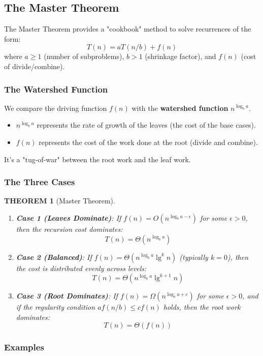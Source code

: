 \documentclass[12pt]{article}
\theoremstyle{blueplain}
\newtheorem{theorem}{THEOREM}[section]
\theoremstyle{bluedef}
\theoremstyle{blueremark}
\begin{document}
\subsection{The Master Theorem}

The Master Theorem provides a "cookbook" method to solve recurrences of the form:
\[ T(n) = aT(n/b) + f(n) \]
where $a \ge 1$ (number of subproblems), $b > 1$ (shrinkage factor), and $f(n)$ (cost of divide/combine).

\subsubsection{The Watershed Function}
We compare the driving function $f(n)$ with the \textbf{watershed function} $n^{\log_b a}$.
\begin{itemize}
    \item $n^{\log_b a}$ represents the rate of growth of the leaves (the cost of the base cases).
    \item $f(n)$ represents the cost of the work done at the root (divide and combine).
\end{itemize}
It's a "tug-of-war" between the root work and the leaf work.

\subsubsection{The Three Cases}

\begin{theorem}[Master Theorem]
    \begin{enumerate}
        \item \textbf{Case 1 (Leaves Dominate)}: If $f(n) = O(n^{\log_b a - \epsilon})$ for some $\epsilon > 0$, then the recursion cost dominates:
              \[ T(n) = \Theta(n^{\log_b a}) \]
        \item \textbf{Case 2 (Balanced)}: If $f(n) = \Theta(n^{\log_b a} \lg^k n)$ (typically $k=0$), then the cost is distributed evenly across levels:
              \[ T(n) = \Theta(n^{\log_b a} \lg^{k+1} n) \]
        \item \textbf{Case 3 (Root Dominates)}: If $f(n) = \Omega(n^{\log_b a + \epsilon})$ for some $\epsilon > 0$, and if the regularity condition $af(n/b) \le cf(n)$ holds, then the root work dominates:
              \[ T(n) = \Theta(f(n)) \]
    \end{enumerate}
\end{theorem}

\subsubsection{Examples}
\end{document}
